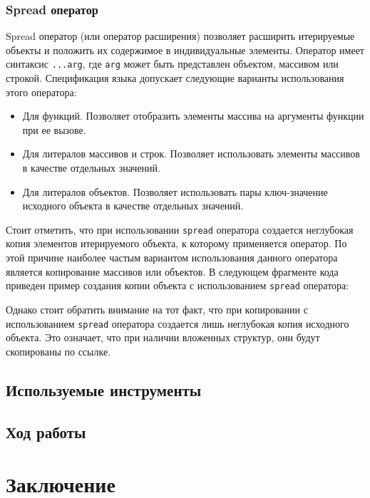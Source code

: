 \documentclass[14pt, a4paper]{article}
\def\code#1{\texttt{#1}} %
\begin{document}
\subsubsection{Spread оператор}
Spread оператор (или оператор расширения) позволяет расширить итерируемые объекты и положить их 
содержимое в индивидуальные элементы. Оператор имеет синтаксис \code{...arg}, где 
\code{arg} может быть представлен объектом, массивом или строкой. Спецификация языка допускает следующие 
варианты использования этого оператора:
\begin{itemize}
  \item {Для функций. Позволяет отобразить элементы массива на аргументы функции при ее вызове.}
  
  \item {Для литералов массивов и строк. Позволяет использовать элементы массивов в качестве отдельных значений.}
  
  \item {Для литералов объектов. Позволяет использовать пары ключ-значение исходного объекта в качестве отдельных значений.}
  
\end{itemize}
Стоит отметить, что при использовании \code{spread} оператора создается неглубокая копия элементов 
итерируемого объекта, к которому применяется оператор. По этой причине наиболее частым вариантом 
использования данного оператора является копирование массивов или объектов. В следующем фрагменте 
кода приведен пример создания копии объекта с использованием \code{spread} оператора:

Однако стоит обратить внимание на тот факт, что при копировании с использованием \code{spread} оператора
создается лишь неглубокая копия исходного объекта. Это означает, что при наличии вложенных структур, 
они будут скопированы по ссылке. 

\subsection{Используемые инструменты}
\subsection{Ход работы}
\pagebreak
\section{Заключение}
\pagebreak
\end{document}
